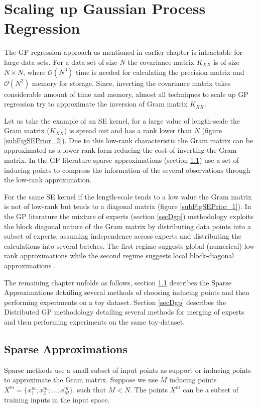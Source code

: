 \chapter{Scaling up Gaussian Process Regression}
\label{chapScalingGPR}

The GP regression approach as mentioned in earlier chapter is intractable for large data sets. For a data set of size \(N\) the covariance matrix \(K_{XX}\) is of size \(N \times N\),  where \(\mathcal{O}\left ( N^{3} \right )\) time is needed for calculating the precision matrix and \(\mathcal{O}\left ( N^{2} \right )\) memory for storage. Since, inverting the covariance matrix takes considerable amount of time and memory, almost all techniques to scale up GP regression try to approximate the inversion of Gram matrix \(K_{XX}\). 

Let us take the example of an SE kernel, for a large value of length-scale the Gram matrix (\(K_{XX}\)) is spread out and has a rank lower than  \(N\) (figure \ref{subFigSEPrior_2}). Due to this low-rank characteristic the Gram matrix can be approximated as a lower rank form reducing the cost of inverting the Gram matrix. In the GP literature sparse approximations (section \ref{secSparseApprox}) use a set of inducing points to compress the information of the several observations through the low-rank approximation. 

For the same SE kernel if the length-scale tends to a low value the Gram matrix is not of low-rank but tends to a diagonal matrix (figure \ref{subFigSEPrior_1}). In the GP literature the mixture of experts (section \ref{secDgp}) methodology exploits the block diagonal nature of the Gram matrix by distributing data points into a subset of experts, assuming independence across experts and distributing the calculations into several batches. The first regime suggests global (numerical) low-rank approximations while the second regime suggests local block-diagonal approximations \cite{march2015askit, chenhan2016inv}. 

The remaining chapter unfolds as follows, section \ref{secSparseApprox} describes the Sparse Approximations detailing several methods of choosing inducing points and then performing experiments on a toy dataset. Section \ref{secDgp} describes the Distributed GP methodology detailing several methods for merging of experts and then performing experiments on the same toy-dataset. 

\section{Sparse Approximations}\label{secSparseApprox}
Sparse methods use a small subset of input points as support or inducing points to approximate the Gram matrix. Suppose we use \(M\) inducing points \(X^{m} = \{x^{m}_{1}; x^{m}_{2}; \ldots; x^{m}_{M}\}\), such that \(M < N\). The points \(X^{m}\) can be a subset of training inputs in the input space. 



